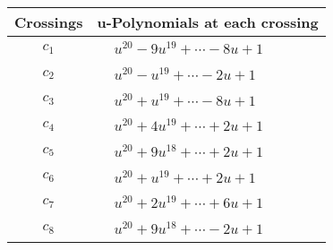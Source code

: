 \documentclass[1p]{elsarticle_modified}
\theoremstyle{definition}
\begin{document}
\begin{tabular}{m{50pt}|m{274pt}}
Crossings & \hspace{64pt}u-Polynomials at each crossing \\
\hline $$\begin{aligned}c_{1}\end{aligned}$$&$\begin{aligned}
&u^{20}-9 u^{19}+\cdots-8 u+1
\end{aligned}$\\
\hline $$\begin{aligned}c_{2}\end{aligned}$$&$\begin{aligned}
&u^{20}- u^{19}+\cdots-2 u+1
\end{aligned}$\\
\hline $$\begin{aligned}c_{3}\end{aligned}$$&$\begin{aligned}
&u^{20}+u^{19}+\cdots-8 u+1
\end{aligned}$\\
\hline $$\begin{aligned}c_{4}\end{aligned}$$&$\begin{aligned}
&u^{20}+4 u^{19}+\cdots+2 u+1
\end{aligned}$\\
\hline $$\begin{aligned}c_{5}\end{aligned}$$&$\begin{aligned}
&u^{20}+9 u^{18}+\cdots+2 u+1
\end{aligned}$\\
\hline $$\begin{aligned}c_{6}\end{aligned}$$&$\begin{aligned}
&u^{20}+u^{19}+\cdots+2 u+1
\end{aligned}$\\
\hline $$\begin{aligned}c_{7}\end{aligned}$$&$\begin{aligned}
&u^{20}+2 u^{19}+\cdots+6 u+1
\end{aligned}$\\
\hline $$\begin{aligned}c_{8}\end{aligned}$$&$\begin{aligned}
&u^{20}+9 u^{18}+\cdots-2 u+1
\end{aligned}$\\

\end{tabular}
\end{document}
